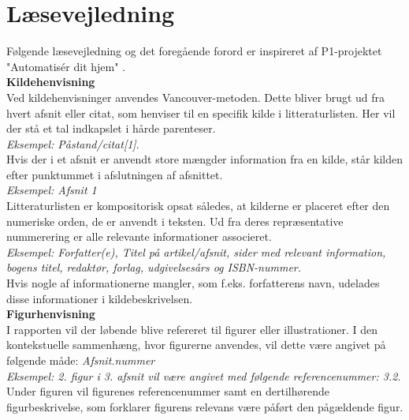 \section*{Læsevejledning}
Følgende læsevejledning og det foregående forord er inspireret af P1-projektet "Automatisér dit hjem" \cite{p1_projekt}.\\

{\bf Kildehenvisning} \\
Ved kildehenvisninger anvendes Vancouver-metoden. Dette bliver brugt ud fra hvert afsnit eller citat, som henviser til en specifik kilde i litteraturlisten. Her vil der stå et tal indkapslet i hårde parenteser. \\

\textit{Eksempel: Påstand/citat\emph{[1]}}.\\

Hvis der i et afsnit er anvendt store mængder information fra en kilde, står kilden efter punktummet i afslutningen af afsnittet.\\

\textit{Eksempel: Afsnit 1}\\

Litteraturlisten er kompositorisk opsat således, at kilderne er placeret efter den numeriske orden, de er anvendt i teksten. Ud fra deres repræsentative nummerering er alle relevante informationer associeret. \\

\textit{Eksempel: Forfatter(e), Titel på artikel/afsnit, sider med relevant information, bogens titel, redaktør, forlag, udgivelsesårs og ISBN-nummer.} \\

Hvis nogle af informationerne mangler, som f.eks. forfatterens navn, udelades disse informationer i kildebeskrivelsen. \\

{\bf Figurhenvisning} \\
I rapporten vil der løbende blive refereret til figurer eller illustrationer. I den kontekstuelle sammenhæng, hvor figurerne anvendes, vil dette være angivet på følgende måde: \textit{Afsnit.nummer} \\

\textit{Eksempel: 2. figur i 3. afsnit vil være angivet med følgende referencenummer: 3.2}. \\

Under figuren vil figurenes referencenummer samt en dertilhørende figurbeskrivelse, som forklarer figurens relevans være påført den pågældende figur. \\ 

